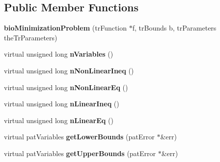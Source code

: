 \subsection*{Public Member Functions}
\begin{DoxyCompactItemize}
\item 
\mbox{\label{classbio_minimization_problem_a2fb56b9f429895b90a61f172f57a5c0c}} 
{\bfseries bio\+Minimization\+Problem} (tr\+Function $\ast$f, tr\+Bounds b, tr\+Parameters the\+Tr\+Parameters)
\item 
\mbox{\label{classbio_minimization_problem_a9fea99d788a3c5217ea04e1f4e9336b7}} 
virtual unsigned long {\bfseries n\+Variables} ()
\item 
\mbox{\label{classbio_minimization_problem_a55a7c6ecb31797bb3f44aa43e7480738}} 
virtual unsigned long {\bfseries n\+Non\+Linear\+Ineq} ()
\item 
\mbox{\label{classbio_minimization_problem_af34d9baa329746bcffe80d2d1a662836}} 
virtual unsigned long {\bfseries n\+Non\+Linear\+Eq} ()
\item 
\mbox{\label{classbio_minimization_problem_a89577e06981d3a531ddb0d0edb741e85}} 
virtual unsigned long {\bfseries n\+Linear\+Ineq} ()
\item 
\mbox{\label{classbio_minimization_problem_a8ccbb51134efa77745b86ac001290fd7}} 
virtual unsigned long {\bfseries n\+Linear\+Eq} ()
\item 
\mbox{\label{classbio_minimization_problem_aa1b20b2977a780642f804230988ffff5}} 
virtual pat\+Variables {\bfseries get\+Lower\+Bounds} (pat\+Error $\ast$\&err)
\item 
\mbox{\label{classbio_minimization_problem_aa4797993f4811c600265c14d8794c392}} 
virtual pat\+Variables {\bfseries get\+Upper\+Bounds} (pat\+Error $\ast$\&err)
\item 
\mbox{\label{classbio_minimization_problem_a1c4fc1866bf1af85942ddd7f91b035e3}} 

\end{DoxyCompactItemize}
